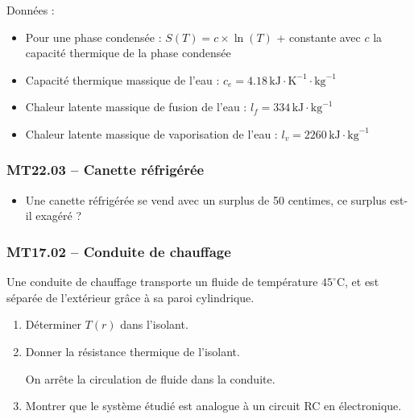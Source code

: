 Données :
\begin{itemize}
\item Pour une phase condensée : $S(T) = c \times \ln(T)$ + constante avec $c$ la capacité thermique de la phase condensée
\item Capacité thermique massique de l'eau : $c_{e} = 4.18\,\text{kJ}\cdot\text{K}^{-1}\cdot\text{kg}^{-1}$
\item Chaleur latente massique de fusion de l'eau : $l_{f} = 334\,\text{kJ}\cdot\text{kg}^{-1}$
\item Chaleur latente massique de vaporisation de l'eau : $l_{v} = 2260\,\text{kJ}\cdot\text{kg}^{-1}$
\end{itemize}

\subsubsection*{MT22.03 -- Canette réfrigérée  \corrige}

\begin{itemize}[label=\textbullet]
\item Une canette réfrigérée se vend avec un surplus de 50 centimes, ce surplus est-il exagéré ?
\end{itemize}

\subsubsection*{MT17.02 -- Conduite de chauffage }

Une conduite de chauffage transporte un fluide de température $45^\circ\text{C}$, et est séparée de l'extérieur grâce à sa paroi cylindrique.

\begin{center}
\end{center}

\begin{enumerate}
\item Déterminer $T(r)$ dans l'isolant.
\item Donner la résistance thermique de l'isolant.

On arrête la circulation de fluide dans la conduite.

\item Montrer que le système étudié est analogue à un circuit RC en électronique.
\end{enumerate}

